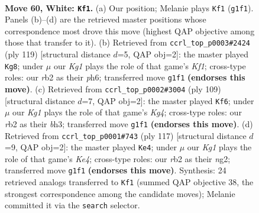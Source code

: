 \documentclass[11pt]{article}
\begin{document}
\clearpage

\begin{figure}[p]\centering
\begin{subfigure}{0.46\textwidth}\centering
\resizebox{\linewidth}{!}{%
\newchessgame
\chessboard[
  setfen={8/7k/8/4p1p1/5p2/5B2/1r6/6K1 w - - 31 60},
  showmover=false,
  pgfstyle=straightmove, color=movearrow, markmove={g1-f1}
]}
\caption{}
\end{subfigure}\hfill
\begin{subfigure}{0.46\textwidth}\centering
\resizebox{\linewidth}{!}{%
\newchessgame
\chessboard[
  setfen={5k2/8/4K2P/6P1/5P2/8/1b6/8 b - - 0 60},
  showmover=false,
  pgfstyle=straightmove, color=movearrow, markmove={f8-g8}
]}
\caption{}
\end{subfigure}
\\[4pt]
\begin{subfigure}{0.46\textwidth}\centering
\resizebox{\linewidth}{!}{%
\newchessgame
\chessboard[
  setfen={8/8/1b1p4/1P1P2k1/2P5/5K1B/8/8 b - - 0 55},
  showmover=false,
  pgfstyle=straightmove, color=movearrow, markmove={g5-f6}
]}
\caption{}
\end{subfigure}\hfill
\begin{subfigure}{0.46\textwidth}\centering
\resizebox{\linewidth}{!}{%
\newchessgame
\chessboard[
  setfen={8/8/8/4k1b1/6P1/7P/4K1N1/8 b - - 0 59},
  showmover=false,
  pgfstyle=straightmove, color=movearrow, markmove={e5-e4}
]}
\caption{}
\end{subfigure}
\caption{\textbf{Move 60, White: \texttt{Kf1}.} (a) Our position; Melanie plays \texttt{Kf1} (\texttt{g1f1}). Panels (b)--(d) are the retrieved master positions whose correspondence most drove this move (highest QAP objective among those that transfer to it). (b) Retrieved from \texttt{ccrl\_top\_p0003\#2424} (ply 119) [structural distance $d$=5, QAP obj=2]: the master played \texttt{Kg8}; under $\mu$ our \emph{Kg1} plays the role of that game's \emph{Kf1}; cross-type roles: our \emph{r}b2 as their \emph{p}h6; transferred move \texttt{g1f1} \textbf{(endorses this move)}. (c) Retrieved from \texttt{ccrl\_top\_p0002\#3004} (ply 109) [structural distance $d$=7, QAP obj=2]: the master played \texttt{Kf6}; under $\mu$ our \emph{Kg1} plays the role of that game's \emph{Kg4}; cross-type roles: our \emph{r}b2 as their \emph{b}h3; transferred move \texttt{g1f1} \textbf{(endorses this move)}. (d) Retrieved from \texttt{ccrl\_top\_p0001\#743} (ply 117) [structural distance $d$=9, QAP obj=2]: the master played \texttt{Ke4}; under $\mu$ our \emph{Kg1} plays the role of that game's \emph{Ke4}; cross-type roles: our \emph{r}b2 as their \emph{n}g2; transferred move \texttt{g1f1} \textbf{(endorses this move)}. Synthesis: 24 retrieved analogs transferred to \texttt{Kf1} (summed QAP objective 38, the strongest correspondence among the candidate moves); Melanie committed it via the \texttt{search} selector.}
\label{fig:thought-m118}
\end{figure}
\end{document}
